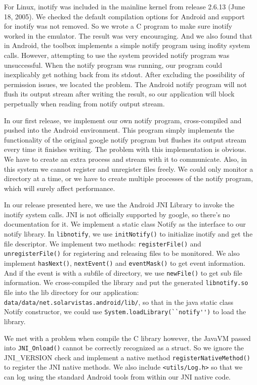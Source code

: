 For Linux, inotify was included in the mainline kernel from release 2.6.13 (June 18, 2005)\cite{Love:2005p1294}. We 
checked the default compilation options for Android and support for inotify was not removed. So we wrote a 
C program to make sure inotify worked in the emulator. The result was very encouraging. And we also found that in Android, 
the toolbox implements a simple notify program using inofity system calls. However, attempting to use the 
system provided notify program was unsuccessful. When the notify program was running, our program could inexplicably get nothing back from 
its stdout. After excluding the possibility of permission issues, we located the problem. The Android notify program will 
not flush its output stream after writing the result, so our application will block perpetually when reading from notify output stream. 

In our first release, we implement our own notify program, cross-compiled and pushed into the Android environment. This 
program simply implements the functionality of the original google notify program but flushes its output 
stream every time it finishes writing. The problem with this implementation is obvious. We have to create an extra process 
and stream with it to communicate. Also, in this system we cannot register and unregister files freely. 
We could only monitor a directory at a time, or we have to create multiple processes of the notify program, which will surely 
affect performance. 

In our release presented here, we use the Android JNI Library to invoke the inotify system calls. JNI is not officially supported by 
google, so there's no documentation for it. We implement a static class Notify as the interface to our notify library. 
In \verb+libnotify+, we use \verb+initNotify()+ to initialize inotify and get the file descriptor. We implement two 
methods: \verb+registerFile()+ and \verb+unregisterFile()+ for registering and releasing files to be monitored. 
We also implement \verb+hasNext()+, \verb+nextEvent()+ and \verb+eventMask()+ to get event information. And if the 
event is with a subfile of directory, we use \verb+newFile()+ to get sub file information. We cross-compiled the 
library and put the generated \verb+libnotify.so+ file into the lib directory for our application: 
\verb+data/data/net.solarvistas.android/lib/+, so that in the java static class Notify constructor, we could use 
\verb+System.loadLibrary(``notify'')+ to load the library. 

We met with a problem when compile the C library however, the JavaVM passed into \verb+JNI_Onload()+ cannot be correctly recognized 
as a struct. So we ignore the JNI\_VERSION check and implement a native method \verb+registerNativeMethod()+ to register 
the JNI native methods. We also include \verb+<utils/Log.h>+ so that we can log using the standard Android tools from within our JNI native code.

